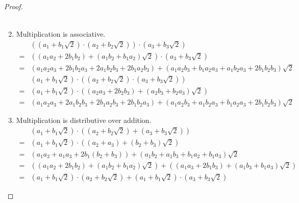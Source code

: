 \begin{proof}
\begin{enumerate}[label = (\arabic*)]
\begin{align*}
		      \end{align*}
		\item Multiplication is associative.
		      \begin{align*}
			        & \left((a_{1} + b_{1}\sqrt{2})\cdot (a_{2} + b_{2}\sqrt{2})\right)\cdot (a_{3} + b_{3}\sqrt{2})                                                                \\
			      = & \left((a_{1}a_{2} + 2b_{1}b_{2}) + (a_{1}b_{2} + b_{1}a_{2})\sqrt{2}\right)\cdot(a_{3} + b_{3}\sqrt{2})                                                       \\
			      = & (a_{1}a_{2}a_{3} + 2b_{1}b_{2}a_{3} + 2a_{1}b_{2}b_{3} + 2b_{1}a_{2}b_{3}) + (a_{1}a_{2}b_{3} + b_{1}a_{2}a_{3} + a_{1}b_{2}a_{3} + 2b_{1}b_{2}b_{3})\sqrt{2}
		      \end{align*}
		      \begin{align*}
			        & (a_{1} + b_{1}\sqrt{2})\cdot\left((a_{2} + b_{2}\sqrt{2})\cdot(a_{3} + b_{3}\sqrt{2})\right)                                                                  \\
			      = & (a_{1} + b_{1}\sqrt{2})\cdot\left( (a_{2}a_{3} + 2b_{2}b_{3}) + (a_{2}b_{3} + b_{2}a_{3})\sqrt{2} \right)                                                     \\
			      = & (a_{1}a_{2}a_{3} + 2a_{1}b_{2}b_{3} + 2b_{1}a_{2}b_{3} + 2b_{1}b_{2}a_{3}) + (a_{1}a_{2}b_{3} + a_{1}b_{2}a_{3} + b_{1}a_{2}a_{3} + 2b_{1}b_{2}b_{3})\sqrt{2}
		      \end{align*}
		\item Multiplication is distributive over addition.
		      \begin{align*}
			        & (a_{1} + b_{1}\sqrt{2})\cdot \left((a_{2} + b_{2}\sqrt{2}) + (a_{3} + b_{3}\sqrt{2})\right)                                                               \\
			      = & (a_{1} + b_{1}\sqrt{2})\cdot\left((a_{2} + a_{3}) + (b_{2} + b_{3})\sqrt{2}\right)                                                                        \\
			      = & (a_{1}a_{2} + a_{1}a_{3} + 2b_{1}(b_{2} + b_{3})) + (a_{1}b_{2} + a_{1}b_{3} + b_{1}a_{2} + b_{1}a_{3})\sqrt{2}                                           \\
			      = & \left((a_{1}a_{2} + 2b_{1}b_{2}) + (a_{1}b_{2} + b_{1}a_{2})\sqrt{2}\right) + \left((a_{1}a_{3} + 2b_{1}b_{3}) + (a_{1}b_{3} + b_{1}a_{3})\sqrt{2}\right) \\
			      = & (a_{1} + b_{1}\sqrt{2})\cdot (a_{2} + b_{2}\sqrt{2}) + (a_{1} + b_{1}\sqrt{2})\cdot (a_{3} + b_{3}\sqrt{2})

\end{align*}
\end{enumerate}
\end{proof}

